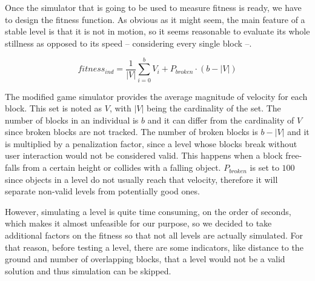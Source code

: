 \documentclass[runningheads,a4paper]{llncs}
\begin{document}

Once the simulator that is going to be used to measure fitness is
ready, we have to design the fitness function. As obvious as it
might seem, the main feature of a stable level is that it 
is not in motion, so it seems reasonable to evaluate its whole stillness as opposed to its speed -- considering every single block --.

$$fitness_{ind} = \frac{1}{|V|}\sum_{i=0}^{b}{V_i} + P_{broken}\cdot(b-|V|)$$

The modified 
game simulator provides the average magnitude of
velocity for each block. %
This set is noted as $V$, with $|V|$ being the cardinality of the set. The number of blocks in an individual is $b$ and it can differ from the cardinality of $V$ since broken blocks are not tracked. The number of broken blocks is $b-|V|$ and it is multiplied by a penalization factor, since a level whose blocks break without user interaction would not be considered valid. This happens when a block free-falls from a certain height or collides with a falling object. 
$P_{broken}$ is set to $100$ since objects in a level do not usually reach that 
velocity, therefore it will separate non-valid levels from potentially good 
ones.



However, simulating a level is quite time consuming, on the order of
seconds, which makes it almost unfeasible for our purpose, so we
decided to take additional factors on the fitness so that not all
levels are actually simulated. 
For that reason, before testing a level, there are some indicators, like
distance to the ground and number of overlapping blocks, that a level would 
not be a valid solution
and thus simulation can be skipped.
\end{document}

